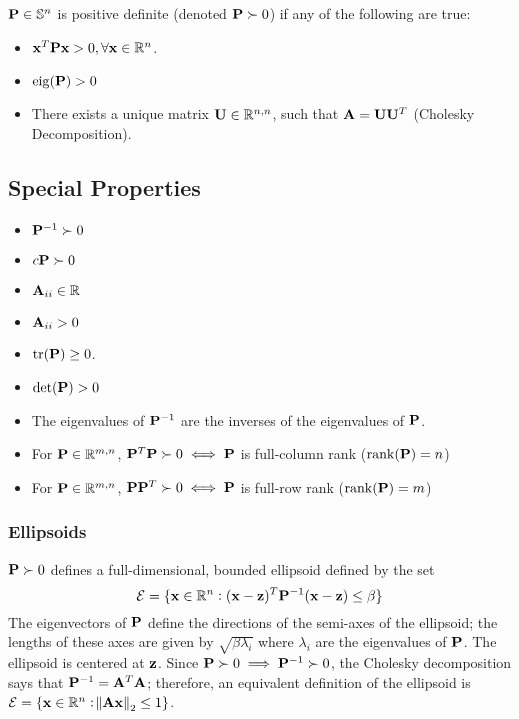 $\mathbf{P}\in\mathbb{S}^{n}$ is positive definite (denoted $\mathbf{P}\succ0$) if any of the following are true:
\begin{itemize}
\item $\mathbf{x}^T\mathbf{P}\mathbf{x}>0,\forall\mathbf{x}\in\mathbb{R}^{n}$.
\item $\operatorname{eig}(\mathbf{P})>0$
\item There exists a unique matrix $\mathbf{U}\in\mathbb{R}^{n,n}$, such that $\mathbf{A}=\mathbf{U}\mathbf{U}^T$ (Cholesky Decomposition). %
\end{itemize}


\subsection*{Special Properties}

\begin{itemize}
\item $\mathbf{P}^{-1}\succ0$
\item $c\mathbf{P}\succ0$
\item $\mathbf{A}_{ii}\in\mathbb{R}$
\item $\mathbf{A}_{ii}>0$
\item $\operatorname{tr}(\mathbf{P})\ge0$. %
\item $\det(\mathbf{P})>0$
\item The eigenvalues of $\mathbf{P}^{-1}$ are the inverses of the eigenvalues of $\mathbf{P}$.
\item For $\mathbf{P}\in\mathbb{R}^{m,n}$, $\mathbf{P}^T\mathbf{P}\succ0\iff \mathbf{P}$ is full-column rank ($\operatorname{rank}(\mathbf{P})=n$)
\item For $\mathbf{P}\in\mathbb{R}^{m,n}$, $\mathbf{P}\mathbf{P}^T\succ0\iff \mathbf{P}$ is full-row rank ($\operatorname{rank}(\mathbf{P})=m$)
\end{itemize}

\subsubsection{Ellipsoids}
$\mathbf{P}\succ0$ defines a full-dimensional, bounded ellipsoid defined by the set
\begin{equation}
\mathcal{E}=\{\mathbf{x}\in\mathbb{R}^{n}: (\mathbf{x}-\mathbf{z})^T\mathbf{P}^{-1}(\mathbf{x}-\mathbf{z})\le \beta\}
\end{equation}
The eigenvectors of $\mathbf{P}$ define the directions of the semi-axes of the ellipsoid; the lengths of these axes are given by $\sqrt{\beta\lambda_i}$ where $\lambda_i$ are the eigenvalues of $\mathbf{P}$. The ellipsoid is centered at $\mathbf{z}$. Since $\mathbf{P}\succ 0 \implies \mathbf{P}^{-1}\succ 0$, the Cholesky decomposition says that $\mathbf{P}^{-1}=\mathbf{A}^T\mathbf{A}$; therefore, an equivalent definition of the ellipsoid is $\mathcal{E}=\{\mathbf{x}\in\mathbb{R}^{n}: \norm{\mathbf{A}\mathbf{x}}_2\le1\}$.

